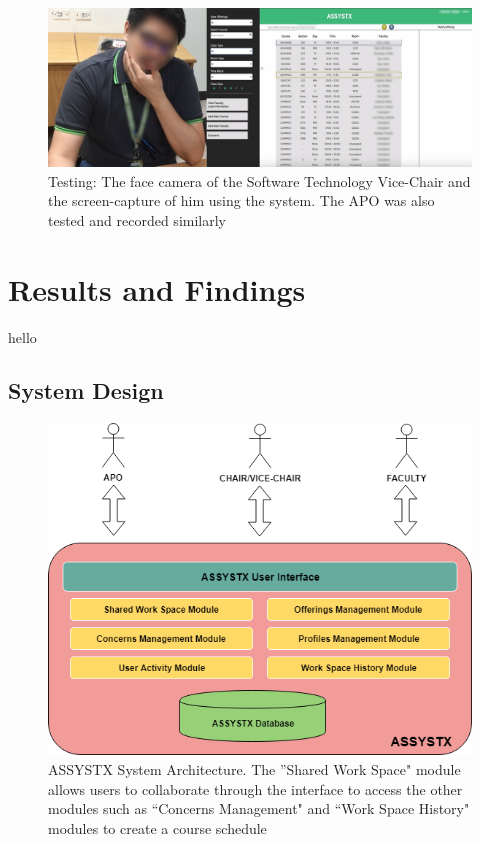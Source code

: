 \begin{figure}[]
\centering
   \includegraphics[scale=1.5,keepaspectratio]{PCSC2019_latex/Tests/sirTighe.png}
   \caption{Testing: The face camera of the Software Technology Vice-Chair and the screen-capture of him using the system. The APO was also tested and recorded similarly}
    \label{fig:cvc_testing}
\end{figure}

\section{Results and Findings}
hello
\subsection{System Design}

\begin{figure}[h]
   \centering
   \includegraphics[scale=0.4]{Diagrams/System_Architecture.png}
   \caption{ASSYSTX System Architecture. The ''Shared Work Space" module allows users to collaborate through the interface to access the other modules such as ``Concerns Management" and ``Work Space History" modules to create a course schedule}
    \label{fig:pipelinediagram}
\end{figure}

